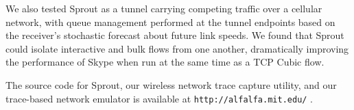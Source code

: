 %

We also tested Sprout as a tunnel carrying competing traffic over a
cellular network, with queue management performed at the tunnel
endpoints based on the receiver's stochastic forecast about future
link speeds. We found that Sprout could isolate interactive and bulk
flows from one another, dramatically improving the performance of
Skype when run at the same time as a TCP Cubic flow.

The source code for Sprout, our wireless network trace capture
utility, and our trace-based network emulator is available at
\texttt{http://alfalfa.mit.edu/} .
